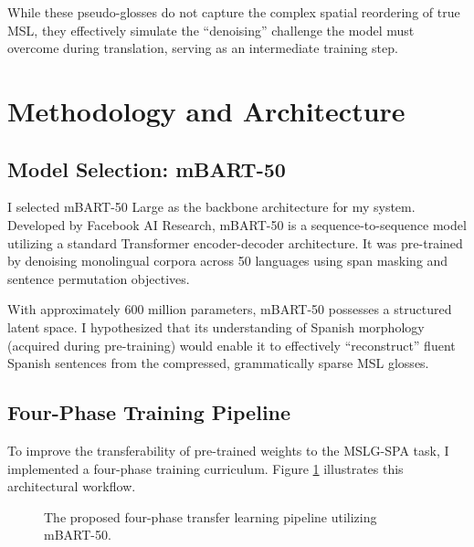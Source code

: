\documentclass[11pt,a4paper,english]{ceurart}
\begin{document}
While these pseudo-glosses do not capture the complex spatial reordering of true MSL, they effectively simulate the ``denoising'' challenge the model must overcome during translation, serving as an intermediate training step.

\section{Methodology and Architecture}

\subsection{Model Selection: mBART-50}
I selected mBART-50 Large as the backbone architecture for my system. Developed by Facebook AI Research, mBART-50 is a sequence-to-sequence model utilizing a standard Transformer encoder-decoder architecture. It was pre-trained by denoising monolingual corpora across 50 languages using span masking and sentence permutation objectives.

With approximately 600 million parameters, mBART-50 possesses a structured latent space. I hypothesized that its understanding of Spanish morphology (acquired during pre-training) would enable it to effectively ``reconstruct'' fluent Spanish sentences from the compressed, grammatically sparse MSL glosses.

\subsection{Four-Phase Training Pipeline}
To improve the transferability of pre-trained weights to the MSLG-SPA task, I implemented a four-phase training curriculum. Figure \ref{fig:pipeline} illustrates this architectural workflow.

\begin{figure}[h]
\centering
{}
\caption{The proposed four-phase transfer learning pipeline utilizing mBART-50.}
\label{fig:pipeline}
\end{figure}
\end{document}
